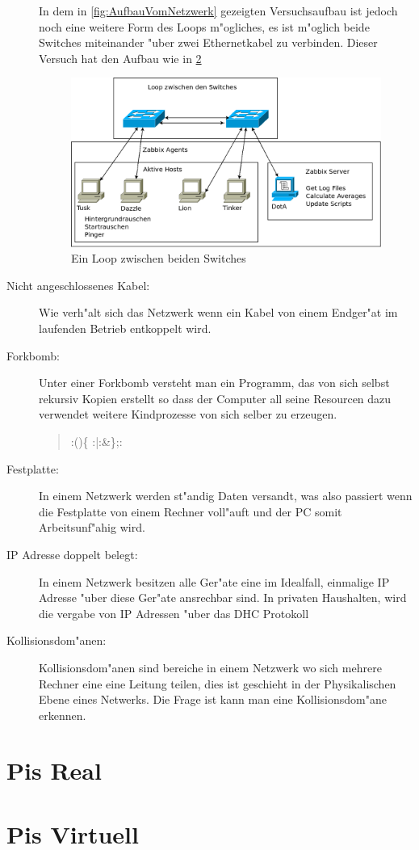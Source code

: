 \begin{description}
\begin{figure}[htbp]
\label{fig:loop1switch}
\end{figure}
In dem in \cref{fig:AufbauVomNetzwerk} gezeigten Versuchsaufbau ist jedoch noch eine weitere Form des Loops m"ogliches, %
es ist m"oglich beide Switches miteinander "uber zwei Ethernetkabel zu verbinden. %
Dieser Versuch hat den Aufbau wie in \cref{fig:loop2switch}
\begin{figure}[htbp]
\centering
\includegraphics*[width=0.9\linewidth]{Abb/Versuche/Loop2Switch}
\caption{Ein Loop zwischen beiden Switches}
\label{fig:loop2switch}
\end{figure}

\item[Nicht angeschlossenes Kabel:] Wie verh"alt sich das Netzwerk wenn ein Kabel von einem %
Endger"at im laufenden Betrieb entkoppelt wird.
\item[Forkbomb:]Unter einer Forkbomb versteht man ein Programm, das von sich selbst rekursiv Kopien erstellt %
so dass der Computer all seine Resourcen dazu verwendet weitere Kindprozesse von sich selber zu erzeugen. %
\begin{quote} 
:()\{ :|:\&\};: \autocite{wiki:forkbomb} 
\end{quote}
\item[Festplatte:]In einem Netzwerk werden st"andig Daten versandt, was also %
passiert wenn die Festplatte von einem Rechner voll"auft und der PC somit Arbeitsunf"ahig wird. %
\item[IP Adresse doppelt belegt:]In einem Netzwerk besitzen alle Ger"ate eine im Idealfall, einmalige  %
IP Adresse "uber diese Ger"ate ansrechbar sind. In privaten Haushalten, wird die vergabe von IP Adressen %
"uber das DHC Protokoll \autocite{ietf:DHCP}
\item[Kollisionsdom"anen:] Kollisionsdom"anen sind bereiche in einem Netzwerk wo sich mehrere Rechner eine %
eine Leitung teilen, dies ist geschieht in der Physikalischen Ebene eines Netwerks. Die Frage ist kann
man eine Kollisionsdom"ane erkennen. 
\end{description}

\section{Pis Real}
\section{Pis Virtuell}


